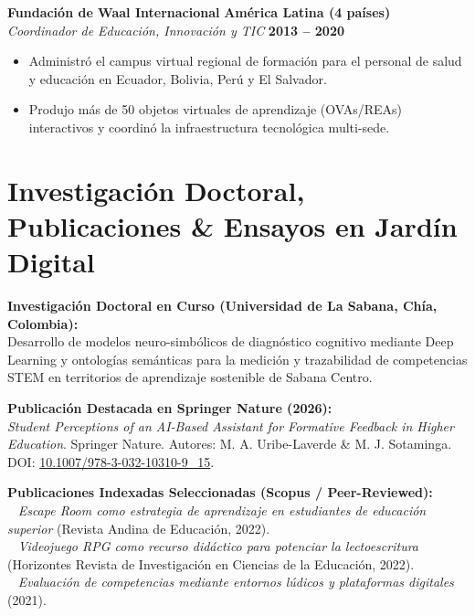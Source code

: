 \documentclass[10pt,a4paper]{article}
\begin{document}
\vspace{4pt}

\textbf{Fundación de Waal Internacional} \hfill \textbf{América Latina (4 países)}\\
\textit{Coordinador de Educación, Innovación y TIC} \hfill \textbf{2013 – 2020}
\begin{itemize}
  \item Administró el campus virtual regional de formación para el personal de salud y educación en Ecuador, Bolivia, Perú y El Salvador.
  \item Produjo más de 50 objetos virtuales de aprendizaje (OVAs/REAs) interactivos y coordinó la infraestructura tecnológica multi-sede.
\end{itemize}

\newpage

\section{Investigación Doctoral, Publicaciones \& Ensayos en Jardín Digital}

\textbf{Investigación Doctoral en Curso (Universidad de La Sabana, Chía, Colombia):}\\
Desarrollo de modelos neuro-simbólicos de diagnóstico cognitivo mediante Deep Learning y ontologías semánticas para la medición y trazabilidad de competencias STEM en territorios de aprendizaje sostenible de Sabana Centro.

\vspace{4pt}

\textbf{Publicación Destacada en Springer Nature (2026):}\\
\textit{Student Perceptions of an AI-Based Assistant for Formative Feedback in Higher Education}. Springer Nature. Autores: M. A. Uribe-Laverde \& M. J. Sotaminga. DOI: \href{https://doi.org/10.1007/978-3-032-10310-9_15}{10.1007/978-3-032-10310-9\_15}.

\vspace{4pt}

\textbf{Publicaciones Indexadas Seleccionadas (Scopus / Peer-Reviewed):}\\
\textbullet~ \textit{Escape Room como estrategia de aprendizaje en estudiantes de educación superior} (Revista Andina de Educación, 2022).\\
\textbullet~ \textit{Videojuego RPG como recurso didáctico para potenciar la lectoescritura} (Horizontes Revista de Investigación en Ciencias de la Educación, 2022).\\
\textbullet~ \textit{Evaluación de competencias mediante entornos lúdicos y plataformas digitales} (2021).
\end{document}
